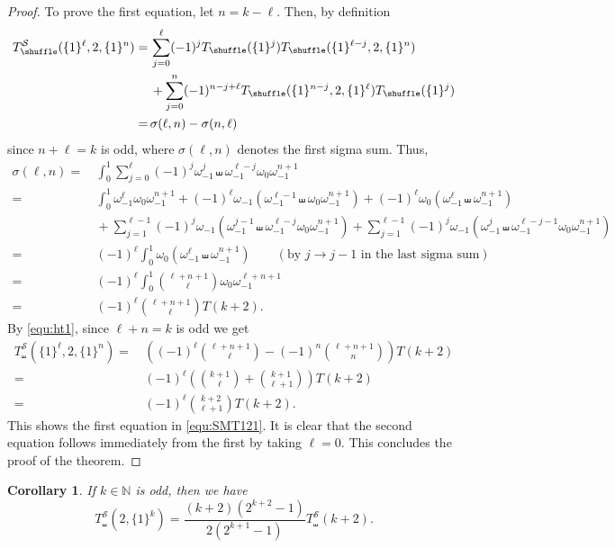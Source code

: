 \documentclass{article}
\newcommand{\sha}{\shuffle}
\newcommand{\Sy}{{\mathcal S}}
\newcommand\om{{\omega}}
\newcommand{\N}{\mathbb{N}}
\theoremstyle{plain}
\newtheorem{cor}[thm]{Corollary}
\theoremstyle{definition}
\begin{document}
\begin{proof}
To prove the first equation, let $n=k-\ell$. Then, by definition
\begin{align}
T_\sha^\Sy(\{1\}^\ell,2,\{1\}^n)=&\, \sum_{j=0}^\ell (-1)^j T_\sha(\{1\}^j) T_\sha(\{1\}^{\ell-j},2,\{1\}^n) \notag\\
&\, +\sum_{j=0}^n (-1)^{n-j+\ell} T_\sha(\{1\}^{n-j},2,\{1\}^\ell) T_\sha(\{1\}^j) \notag\\
=&\,\sigma(\ell,n)-\sigma(n,\ell)   \label{equ:ht1}
\end{align}
since $n+\ell=k$ is odd, where $\sigma(\ell,n)$ denotes the first sigma sum. Thus,
\begin{align*}
\sigma(\ell,n)= &\,\int_0^1 \sum_{j=0}^\ell (-1)^j   \om_{-1}^j \sha \om_{-1}^{\ell-j} \om_0\om_{-1}^{n+1}   \\
=&\,\int_0^1 \om_{-1}^{\ell} \om_0\om_{-1}^{n+1} + (-1)^\ell   \om_{-1}( \om_{-1}^{\ell-1}  \sha  \om_0\om_{-1}^{n+1})
 + (-1)^\ell   \om_0( \om_{-1}^\ell \sha  \om_{-1}^{n+1}) \\
&\,  +\sum_{j=1}^{\ell-1}  (-1)^j     \om_{-1}(\om_{-1}^{j-1} \sha \om_{-1}^{\ell-j} \om_0\om_{-1}^{n+1} )
+\sum_{j=1}^{\ell-1}  (-1)^j     \om_{-1}(\om_{-1}^j \sha \om_{-1}^{\ell-j-1} \om_0\om_{-1}^{n+1} )\\
=&\,   (-1)^\ell \int_0^1   \om_0( \om_{-1}^\ell \sha  \om_{-1}^{n+1}) \qquad(\text{by $j\to j-1$ in the last sigma sum})\\
=&\,   (-1)^\ell \int_0^1  \binom{\ell+n+1}{\ell} \om_0\om_{-1}^{\ell+n+1}\\
=&\,  (-1)^\ell  \binom{\ell+n+1}{\ell}  T(k+2).
\end{align*}
By \eqref{equ:ht1}, since $\ell+n=k$ is odd we get
\begin{align*}
T_\sha^\Sy(\{1\}^\ell,2,\{1\}^n)=&\,\left( (-1)^\ell   \binom{\ell+n+1}{\ell} - (-1)^n   \binom{\ell+n+1}{n}\right)T(k+2) \\
=&\,(-1)^\ell \left( \binom{k+1}{\ell}+\binom{k+1}{\ell+1}\right)T(k+2)    \\
=&\,(-1)^{\ell}\binom{k+2}{\ell+1}  T(k+2).
\end{align*}
This shows the first equation in \eqref{equ:SMT121}. It is clear that the second equation follows immediately from the first by taking $\ell=0$. This concludes the proof of the theorem.
\end{proof}

\begin{cor}\label{cor:SMTV21k}
If $k\in\N$ is odd, then we have
\begin{equation}\label{equ:SMTV21k}
T_\sha^\Sy(2,\{1\}^k)=\frac{(k+2)(2^{k+2}-1)}{2(2^{k+1}-1)}T_\sha^\Sy(k+2).
\end{equation}
\end{cor}
\end{document}
